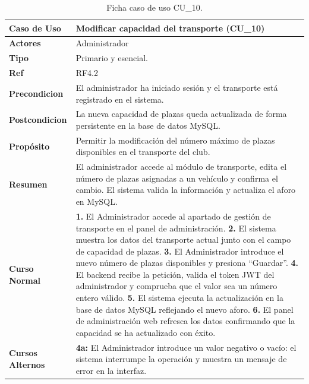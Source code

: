         \begin{table}[htbp]
        \centering
        \footnotesize
        \renewcommand{\arraystretch}{0.95}
        \begin{tabularx}{\textwidth}{|l|X|}
        \hline
        \rowcolor[HTML]{EFEFEF} 
        \textbf{Caso de Uso} & \textbf{Modificar capacidad del transporte (CU\_10)} \\ \hline
        \textbf{Actores} & Administrador \\ \hline
        \textbf{Tipo} & Primario y esencial. \\ \hline
        \textbf{Ref} & RF4.2 \\ \hline
        \textbf{Precondicion} & El administrador ha iniciado sesión y el transporte está registrado en el sistema. \\ \hline
        \textbf{Postcondicion} & La nueva capacidad de plazas queda actualizada de forma persistente en la base de datos MySQL. \\ \hline
        \textbf{Propósito} & Permitir la modificación del número máximo de plazas disponibles en el transporte del club. \\ \hline
        \textbf{Resumen} & El administrador accede al módulo de transporte, edita el número de plazas asignadas a un vehículo y confirma el cambio. El sistema valida la información y actualiza el aforo en MySQL. \\ \hline
        \textbf{Curso Normal} & 
        \textbf{1.} El Administrador accede al apartado de gestión de transporte en el panel de administración.\newline
        \textbf{2.} El sistema muestra los datos del transporte actual junto con el campo de capacidad de plazas.\newline
        \textbf{3.} El Administrador introduce el nuevo número de plazas disponibles y presiona ``Guardar''.\newline
        \textbf{4.} El backend recibe la petición, valida el token JWT del administrador y comprueba que el valor sea un número entero válido.\newline
        \textbf{5.} El sistema ejecuta la actualización en la base de datos MySQL reflejando el nuevo aforo.\newline
        \textbf{6.} El panel de administración web refresca los datos confirmando que la capacidad se ha actualizado con éxito. \\ \hline
        \textbf{Cursos Alternos} & 
        \textbf{4a:} El Administrador introduce un valor negativo o vacío: el sistema interrumpe la operación y muestra un mensaje de error en la interfaz. \\ \hline
        \end{tabularx}
        \caption{Ficha caso de uso CU\_10.}
        \label{tab:cu_10}
        \end{table}

